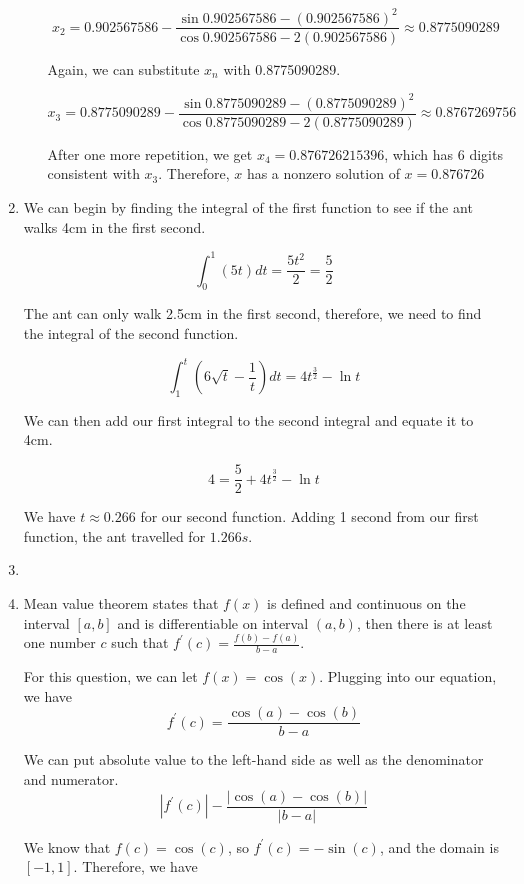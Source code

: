 \documentclass[11pt, letterpaper, twoside]{article}
\begin{document}
\begin{enumerate}
\begin{enumerate}[label=\alph*)]
\[x_2=0.902567586-\frac{\sin0.902567586-\left(0.902567586\right)^2}{\cos0.902567586-2\left(0.902567586\right)}\approx0.8775090289\]

Again, we can substitute \(x_n\) with 0.8775090289.

\[x_3=0.8775090289-\frac{\sin0.8775090289-\left(0.8775090289\right)^2}{\cos0.8775090289-2\left(0.8775090289\right)}\approx0.8767269756\]

After one more repetition, we get \(x_4=0.876726215396\), which has 6 digits consistent with \(x_3\).
Therefore, \(x\) has a nonzero solution of \(\boxed{x=0.876726}\)

\end{enumerate}

\item %
We can begin by finding the integral of the first function to see if the ant walks 4cm in the first second.

\[\int_0^1(5t)dt=\frac{5t^2}{2}=\frac{5}{2}\]

The ant can only walk 2.5cm in the first second, therefore, we need to find the integral of the second function.

\[\int_1^t(6\sqrt t-\frac{1}{t})dt=4t^{\frac{3}{2}}-\ln t\]

We can then add our first integral to the second integral and equate it to 4cm.

\[4=\frac{5}{2}+4t^{\frac{3}{2}}-\ln t \]

We have \(t\approx0.266\) for our second function. 
Adding 1 second from our first function, the ant travelled for \(\boxed{1.266s}\).

\item %
\item %
Mean value theorem states that \(f(x)\) is defined and continuous on the interval \([a, b]\) and is differentiable on interval \((a,b)\),
then there is at least one number \(c\) such that \(f^\prime(c)=\frac{f(b)-f(a)}{b-a}\).

For this question, we can let \(f(x)=\cos(x)\). 
Plugging into our equation, we have 
\[f^\prime(c)=\frac{\cos(a)-\cos(b)}{b-a}\]

We can put absolute value to the left-hand side as well as the denominator and numerator.
\[|f^\prime(c)|-\frac{|\cos(a)-\cos(b)|}{|b-a|}\]

We know that \(f(c)=\cos(c)\), so \(f^\prime(c)=-\sin(c)\), and the domain is \([-1, 1]\).
Therefore, we have 


\end{enumerate}
\end{document}
